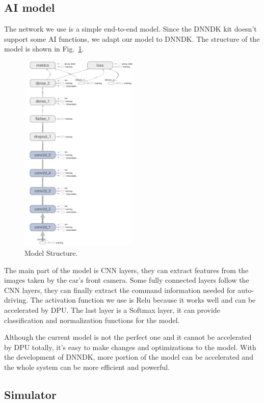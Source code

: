 \documentclass[conference]{IEEEtran}
\begin{document}
\subsection{AI model}

The network we use is a simple end-to-end model. Since the DNNDK kit doesn't support some AI functions, we adapt our model to DNNDK. The structure of the model is shown in Fig.~\ref{ms}.  

\begin{figure}[htbp]
\centerline{\includegraphics[width=0.5\textwidth]{net-structure.png}}
\caption{Model Structure.}
\label{ms}
\end{figure}

The main part of the model is CNN layers, they can extract features from the images taken by the car's front camera. Some fully connected layers follow the CNN layers, they can finally extract the command information needed for auto-driving. The activation function we use is Relu because it works well and can be accelerated by DPU. The last layer is a Softmax layer, it can provide classification and normalization functions for the model.  

Although the current model is not the perfect one and it cannot be accelerated by DPU totally, it's easy to make changes and optimizations to the model. With the development of DNNDK, more portion of the model can be accelerated and the whole system can be more efficient and powerful.

\subsection{Simulator}
\end{document}
